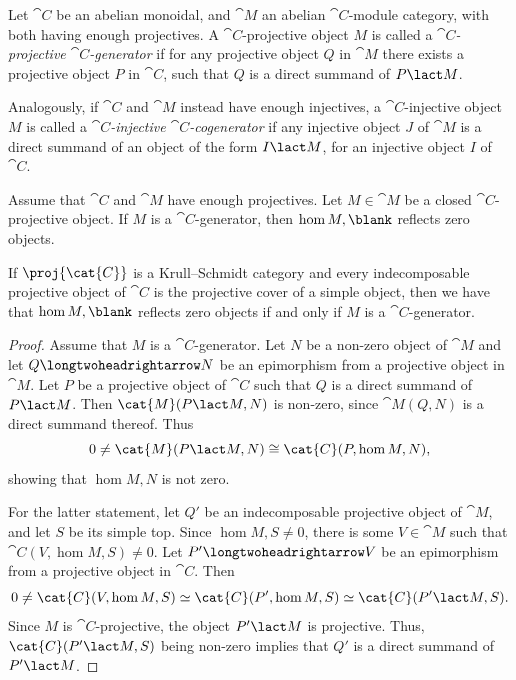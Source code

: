 \begin{definition}
  Let \(\cat{C}\) be an abelian monoidal,
  and \(\cat{M}\) an abelian \(\cat{C}\)\hyp{}module category,
  with both having enough projectives.
  A \(\cat{C}\)\hyp{}projective object \(M\) is called a \emph{\(\cat{C}\)\hyp{}projective \(\cat{C}\)\hyp{}generator}
  if for any projective object \(Q\) in \(\cat{M}\)
  there exists a projective object \(P\) in \(\cat{C}\),
  such that \(Q\) is a direct summand of \(P \lact M\).

  Analogously, if \(\cat{C}\) and \(\cat{M}\) instead have enough injectives,
  a \(\cat{C}\)\hyp{}injective object \(M\) is called a \emph{\(\cat{C}\)\hyp{}injective \(\cat{C}\)\hyp{}cogenerator}
  if any injective object \(J\) of \(\cat{M}\) is a direct summand of an object of the form \(I \lact M\),
  for an injective object \(I\) of \(\cat{C}\).
\end{definition}

\begin{proposition}\label{ProjReflect}
  Assume that \(\cat{C}\) and \(\cat{M}\) have enough projectives.
  Let \(M \in \cat{M}\) be a closed \(\cat{C}\)\hyp{}projective object.
  If \(M\) is a \(\cat{C}\)\hyp{}generator, then \(\hom{M, \blank}\) reflects zero objects.

  If \(\proj{\cat{C}}\) is a Krull--Schmidt category
  and every indecomposable projective object of \(\cat{C}\) is the projective cover of a simple object,
  then we have that \(\hom{M, \blank}\) reflects zero objects
  if and only if
  \(M\) is a \(\cat{C}\)\hyp{}generator.
\end{proposition}
\begin{proof}
  Assume that \(M\) is a \(\cat{C}\)\hyp{}generator. Let \(N\) be a non-zero object of \(\cat{M}\) and let \(Q \longtwoheadrightarrow N\) be an epimorphism from a projective object in \(\cat{M}\). Let \(P\) be a projective object of \(\cat{C}\) such that \(Q\) is a direct summand of \(P \lact M\). Then \(\cat{M}(P \lact M, N)\) is non-zero, since \(\cat{M}(Q,N)\) is a direct summand thereof. Thus
  \[
    0 \neq \cat{M}(P \lact M, N) \cong \cat{C}(P,\hom{M,N}),
  \]
  showing that \(\hom{M,N}\) is not zero.

  For the latter statement, let \(Q'\) be an indecomposable projective object of \(\cat{M}\), and let \(S\) be its simple top. Since \(\hom{M,S} \neq 0\), there is some \(V \in \cat{M}\) such that \(\cat{C}(V,\hom{M,S}) \neq 0\). Let \(P' \longtwoheadrightarrow V\) be an epimorphism from a projective object in \(\cat{C}\). Then
  \[
    0\neq \cat{C}(V, \hom{M,S}) \simeq \cat{C}(P',\hom{M,S}) \simeq \cat{C}(P' \lact M, S).
  \]
  Since \(M\) is \(\cat{C}\)\hyp{}projective, the object \(P' \lact M\) is projective. Thus, \(\cat{C}(P' \lact M, S)\) being non-zero implies that \(Q'\) is a direct summand of \(P' \lact M\).
\end{proof}

